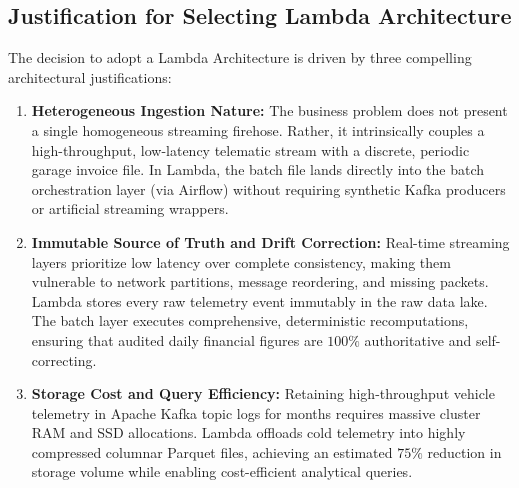 \documentclass[11pt,a4paper]{article}
\begin{document}
\subsection{Justification for Selecting Lambda Architecture}
The decision to adopt a Lambda Architecture is driven by three compelling architectural justifications:
\begin{enumerate}
    \item \textbf{Heterogeneous Ingestion Nature:} The business problem does not present a single homogeneous streaming firehose. Rather, it intrinsically couples a high-throughput, low-latency telematic stream with a discrete, periodic garage invoice file. In Lambda, the batch file lands directly into the batch orchestration layer (via Airflow) without requiring synthetic Kafka producers or artificial streaming wrappers.
    \item \textbf{Immutable Source of Truth and Drift Correction:} Real-time streaming layers prioritize low latency over complete consistency, making them vulnerable to network partitions, message reordering, and missing packets. Lambda stores every raw telemetry event immutably in the raw data lake. The batch layer executes comprehensive, deterministic recomputations, ensuring that audited daily financial figures are $100\%$ authoritative and self-correcting.
    \item \textbf{Storage Cost and Query Efficiency:} Retaining high-throughput vehicle telemetry in Apache Kafka topic logs for months requires massive cluster RAM and SSD allocations. Lambda offloads cold telemetry into highly compressed columnar Parquet files, achieving an estimated $75\%$ reduction in storage volume while enabling cost-efficient analytical queries.
\end{enumerate}
\end{document}
